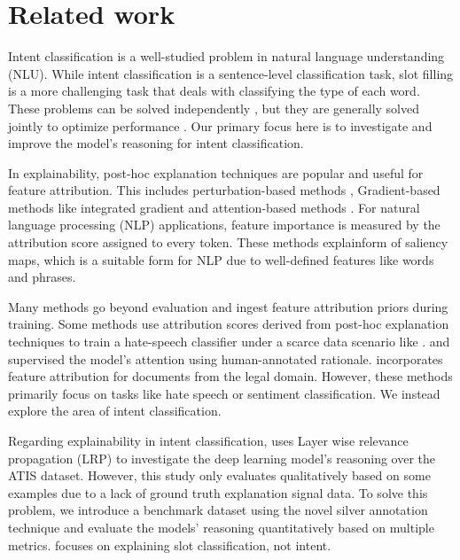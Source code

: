 \section{Related work}
Intent classification is a well-studied problem in natural language understanding (NLU). While intent classification is a sentence-level classification task, slot filling is a more challenging task that deals with classifying the type of each word. These problems can be solved independently \citet{raymond2007generative}, but they are generally solved jointly to optimize performance \citet{chen2019bert,qin2021co}. Our primary focus here is to investigate and improve the model's reasoning for intent classification.

In explainability, post-hoc explanation techniques are popular and useful for feature attribution. This includes perturbation-based methods \citep{ribeiro2016should,ribeiro2018anchors}, Gradient-based methods like integrated gradient \cite{sundararajan2017axiomatic} and attention-based methods \citep{wu2021explaining, wang-etal-2016-attention, pmlr-v37-xuc15}. For natural language processing (NLP) applications, feature importance is measured by the attribution score assigned to every token. These methods explainform of saliency maps, which is a suitable form for NLP due to well-defined features like words and phrases.

Many methods go beyond evaluation and ingest feature attribution priors during training. Some methods use attribution scores derived from post-hoc explanation techniques to train a hate-speech classifier under a scarce data scenario like \citet{liu2019incorporating}. \citet{zhong2019fine} and \citet{mathew2021hatexplain} supervised the model's attention using human-annotated rationale. \citet{jayaram-allaway-2021-human} incorporates feature attribution for documents from the legal domain. However, these methods primarily focus on tasks like hate speech or sentiment classification. We instead explore the area of intent classification.

Regarding explainability in intent classification, \citet{joshi2021towards} uses Layer wise relevance propagation (LRP) \citep{montavon2019layer} to investigate the deep learning model's reasoning over the ATIS dataset. However, this study only evaluates qualitatively based on some examples due to a lack of ground truth explanation signal data. To solve this problem, we introduce a benchmark dataset using the novel silver annotation technique and evaluate the models' reasoning quantitatively based on multiple metrics. \citet{gunaratna2022explainable} focuses on explaining slot classification, not intent.